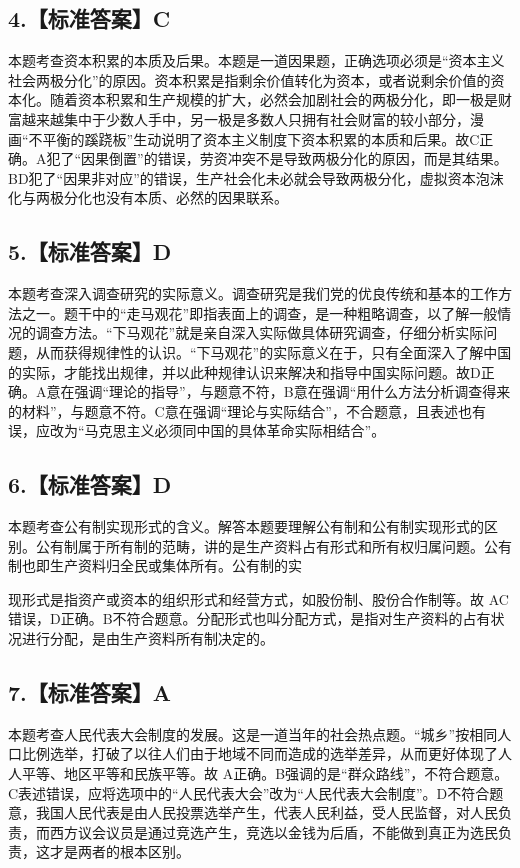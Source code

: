 \documentclass[UTF8,11pt]{ctexart}
\begin{document}
\subsection*{4.【标准答案】C}

本题考查资本积累的本质及后果。本题是一道因果题，正确选项必须是“资本主义社会两极分化”的原因。资本积累是指剩余价值转化为资本，或者说剩余价值的资本化。随着资本积累和生产规模的扩大，必然会加剧社会的两极分化，即一极是财富越来越集中于少数人手中，另一极是多数人只拥有社会财富的较小部分，漫画“不平衡的蹊跷板”生动说明了资本主义制度下资本积累的本质和后果。故C正确。A犯了“因果倒置”的错误，劳资冲突不是导致两极分化的原因，而是其结果。BD犯了“因果非对应”的错误，生产社会化未必就会导致两极分化，虚拟资本泡沫化与两极分化也没有本质、必然的因果联系。


\subsection*{5.【标准答案】D}

本题考查深入调查研究的实际意义。调查研究是我们党的优良传统和基本的工作方法之一。题干中的“走马观花”即指表面上的调查，是一种粗略调查，以了解一般情况的调查方法。“下马观花”就是亲自深入实际做具体研究调查，仔细分析实际问题，从而获得规律性的认识。“下马观花”的实际意义在于，只有全面深入了解中国的实际，才能找出规律，并以此种规律认识来解决和指导中国实际问题。故D正确。A意在强调“理论的指导”，与题意不符，B意在强调“用什么方法分析调查得来的材料”，与题意不符。C意在强调“理论与实际结合”，不合题意，且表述也有误，应改为“马克思主义必须同中国的具体革命实际相结合”。


\subsection*{6.【标准答案】D}

本题考查公有制实现形式的含义。解答本题要理解公有制和公有制实现形式的区别。公有制属于所有制的范畴，讲的是生产资料占有形式和所有权归属问题。公有制也即生产资料归全民或集体所有。公有制的实


现形式是指资产或资本的组织形式和经营方式，如股份制、股份合作制等。故 AC 错误，D正确。B不符合题意。分配形式也叫分配方式，是指对生产资料的占有状况进行分配，是由生产资料所有制决定的。


\subsection*{7.【标准答案】A}

本题考查人民代表大会制度的发展。这是一道当年的社会热点题。“城乡”按相同人口比例选举，打破了以往人们由于地域不同而造成的选举差异，从而更好体现了人人平等、地区平等和民族平等。故 A正确。B强调的是“群众路线”，不符合题意。C表述错误，应将选项中的“人民代表大会”改为“人民代表大会制度”。D不符合题意，我国人民代表是由人民投票选举产生，代表人民利益，受人民监督，对人民负责，而西方议会议员是通过竞选产生，竞选以金钱为后盾，不能做到真正为选民负责，这才是两者的根本区别。
\end{document}
